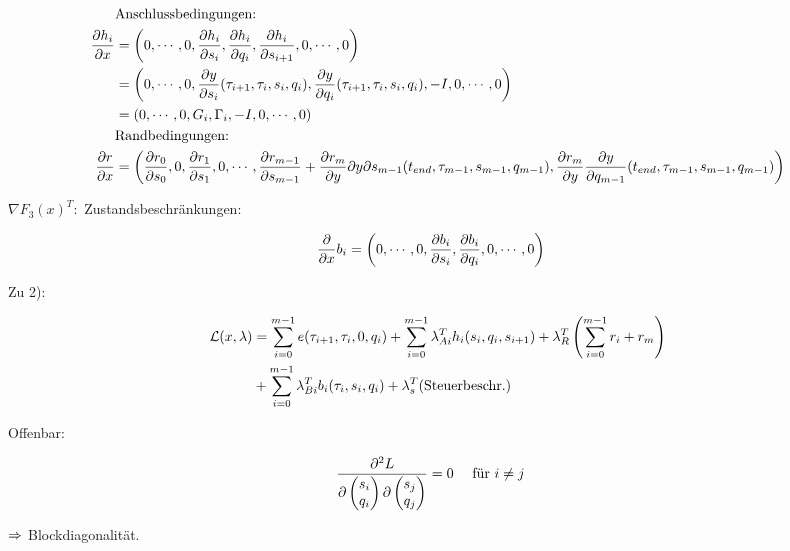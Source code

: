 \begin{align*}
& \text{Anschlussbedingungen:} \\
\frac{\partial h_i}{\partial x} &= \left( 0,\cdots,0, \frac{\partial h_i}{\partial s_i}, \frac{\partial h_i}{\partial q_i}, \frac{\partial h_i}{\partial s_{i+1}}, 0, \cdots, 0 \right) \\
&= \left( 0,\cdots,0, \frac{\partial y}{\partial s_i} (\tau_{i+1}, \tau_i, s_i, q_i), \frac{\partial y}{\partial q_i} (\tau_{i+1}, \tau_i, s_i, q_i), -I, 0, \cdots, 0 \right) \\
&= (0,\cdots, 0, G_i, \Gamma_i, -I, 0,\cdots,0) \\
& \text{Randbedingungen:} \\
\frac{\partial r}{\partial x} &= \left( \frac{\partial r_0}{\partial s_0}, 0, \frac{\partial r_1}{\partial s_1}, 0, \cdots, \frac{\partial r_{m-1}}{\partial s_{m-1}} + \frac{\partial r_m}{\partial y}{\partial y}{\partial s_{m-1}} ({t_{end}}, \tau_{m-1}, s_{m-1}, q_{m-1}), \frac{\partial r_m}{\partial y} \frac{\partial y}{\partial q_{m-1}} ({t_{end}}, \tau_{m-1}, s_{m-1}, q_{m-1}) \right) \\
\end{align*}

$\nabla F_3(x)^T: $ Zustandsbeschränkungen:

\begin{align*}
\frac{\partial}{\partial x} b_i &= \left( 0,\cdots, 0, \frac{\partial b_i}{\partial s_i}, \frac{\partial b_i}{\partial q_i}, 0, \cdots, 0 \right) 
\end{align*}

Zu 2): 

\begin{align*}
\mathcal L(x,\lambda) &= \sum\limits_{i=0}^{m-1} e(\tau_{i+1}, \tau_i, 0, q_i) + \sum\limits_{i=0}^{m-1} \lambda_{Ai}^T h_i (s_i, q_i, s_{i+1}) + \lambda_R^T \left( \sum\limits_{i=0}^{m-1} r_i + r_m \right) \\
&+ \sum\limits_{i=0}^{m-1} \lambda_{Bi}^T b_i(\tau_i, s_i, q_i) + \lambda_s^T (\text{Steuerbeschr.})
\end{align*}

Offenbar:

\begin{align*}
\frac{\partial^2 L}{\partial \begin{pmatrix} s_i \\ q_i \end{pmatrix} \partial \begin{pmatrix} s_j \\ q_j \end{pmatrix} } &= 0 \quad \text{ für } i\neq j
\end{align*}

$\Rightarrow$ Blockdiagonalität.

